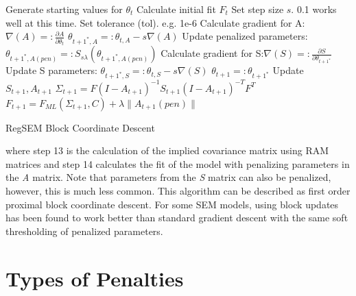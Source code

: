 \documentclass[article]{jss}
\begin{document}
\begin{minipage}{\textwidth}
    \begin{algorithm}[H]
        \begin{algorithmic}[1]
            \State Generate starting values for $\theta_{t}$
            \State Calculate initial fit $F_{t}$
            \State Set step size $s$. 0.1 works well at this time.
            \State Set tolerance (tol). e.g. 1e-6
            \State Calculate gradient for A:$ \nabla (A) =:  \frac{\partial A}{\partial \theta_{t}}$
            \State $ \theta_{t+1^{*},A} =: \theta_{t,A} - s \nabla(A)$
            \State  Update penalized parameters: $\theta_{t+1^{*},A(pen)} =: S_{s \lambda}(\theta_{t+1^{*},A(pen)})$
            \State Calculate gradient for S:$ \nabla (S) =:  \frac{\partial S}{\partial \theta_{t+1^{*}}}$ 
            \State Update S parameters: $ \theta_{t+1^{*},S} =: \theta_{t,S} - s \nabla(S)$
            \State $\theta_{t+1} =: \theta_{t+1^{*}}$ %
            \State Update $S_{t+1}, A_{t+1}$
            \State $ \Sigma_{t+1} = F(I-A_{t+1})^{-1}S_{t+1}(I-A_{t+1})^{-T}F^{T}$
            \State $ F_{t+1} = F_{ML}(\Sigma_{t+1},C) + \lambda \| A_{t+1}(pen) \|$
            \EndWhile
        \end{algorithmic}
        \caption{RegSEM Block Coordinate Descent}
        \label{alg:seq}
    \end{algorithm}
\end{minipage}

where step 13 is the calculation of the implied covariance matrix using
RAM matrices and step 14 calculates the fit of the model with penalizing
parameters in the \textit{A} matrix. Note that parameters from the
\textit{S} matrix can also be penalized, however, this is much less
common. This algorithm can be described as first order proximal block
coordinate descent. For some SEM models, using block updates has been
found to work better than standard gradient descent with the same soft
thresholding of penalized parameters.

\section{Types of Penalties}\label{types-of-penalties}
\end{document}
